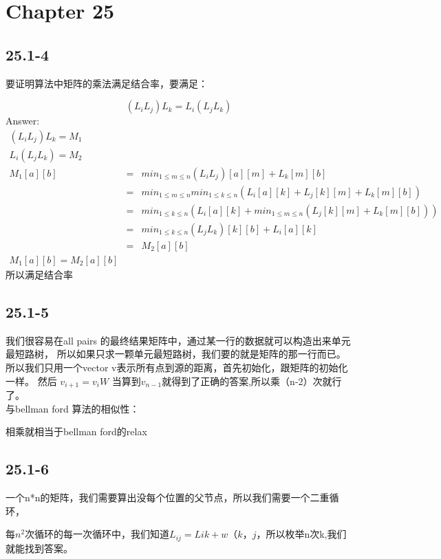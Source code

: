 \documentclass[a4paper,UTF8]{article}
\theoremstyle{definition}
\begin{document}
\section*{Chapter 25 }

\subsection*{25.1-4}

  要证明算法中矩阵的乘法满足结合率，要满足：

  $$(L_iL_j)L_k = L_i(L_jL_k)$$
  Answer:\\
  \begin{eqnarray*}
  (L_iL_j)L_k=M_1\\
  L_i(L_jL_k)=M_2\\
  M_1[a][b] & = & min_{1\leq m \leq n}(L_iL_j)[a][m]+L_k[m][b]\\
            & = & min_{1\leq m \leq n}min_{1\leq k \leq n}(L_i[a][k]+L_j[k][m]+L_k[m][b])\\
            & = & min_{1\leq k \leq n}(L_i[a][k]+min_{1\leq m \leq n}(L_j[k][m]+L_k[m][b]))\\
            & = & min_{1\leq k \leq n}(L_jL_k)[k][b]+L_i[a][k]\\
            & = & M_2[a][b]\\
           M_1[a][b]=M_2[a][b]
  \end{eqnarray*}
所以满足结合率
\subsection*{25.1-5}
我们很容易在all pairs 的最终结果矩阵中，通过某一行的数据就可以构造出来单元最短路树，
所以如果只求一颗单元最短路树，我们要的就是矩阵的那一行而已。
所以我们只用一个vector v表示所有点到源的距离，首先初始化，跟矩阵的初始化一样。
然后 $v_{i+1}=v_iW$  当算到$v_{n-1}$就得到了正确的答案,所以乘（n-2）次就行了。\\
与bellman ford 算法的相似性：

相乘就相当于bellman ford的relax


\subsection*{25.1-6}
一个n*n的矩阵，我们需要算出没每个位置的父节点，所以我们需要一个二重循环，

每$n^2$次循环的每一次循环中，我们知道$L_{ij}=L{ik}+w（k，j$，所以枚举n次k,我们就能找到答案。
\end{document}
